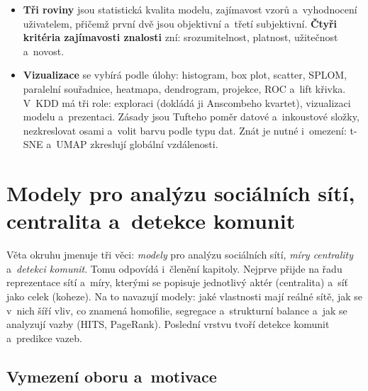 \documentclass[11pt,a4paper]{article}
\theoremstyle{definition}
\begin{document}
\begin{itemize}
      (u~stromu confidence v~listu), vzory se seřadí a~rozdělí do přihrádek a~lift křivka se
      poměřuje s~diagonálou náhodného výběru. U~zkoušky se k~tomu očekává ekonomická úvaha
      o~tom, kolik zásilek se vyplatí poslat.
\item \textbf{Tři roviny } jsou statistická kvalita modelu, zajímavost vzorů
      a~vyhodnocení uživatelem, přičemž první dvě jsou objektivní a~třetí subjektivní.
      \textbf{Čtyři kritéria zajímavosti znalosti} zní: srozumitelnost, platnost, užitečnost
      a~novost.
\item \textbf{Vizualizace} se vybírá podle úlohy: histogram, box plot, scatter, SPLOM,
      paralelní souřadnice, heatmapa, dendrogram, projekce, ROC a~lift křivka. V~KDD má
      tři role: exploraci (dokládá ji Anscombeho kvartet), vizualizaci modelu a~prezentaci.
      Zásady jsou Tufteho poměr datové a~inkoustové složky, nezkreslovat osami a~volit barvu
      podle typu dat. Znát je nutné i~omezení: t-SNE a~UMAP zkreslují globální vzdálenosti.
\end{itemize}

\newpage

\section{Modely pro analýzu sociálních sítí, centralita a~detekce komunit}
\label{sec:sna}

Věta okruhu jmenuje tři věci: \emph{modely} pro analýzu sociálních sítí, \emph{míry
centrality} a~\emph{detekci komunit}. Tomu odpovídá i~členění kapitoly. Nejprve přijde na
řadu reprezentace sítí a~míry, kterými se popisuje jednotlivý aktér (centralita) a~síť jako
celek (koheze). Na to navazují modely: jaké vlastnosti mají reálné sítě, jak se v~nich šíří
vliv, co znamená homofilie, segregace a~strukturní balance a~jak se analyzují vazby (HITS,
PageRank). Poslední vrstvu tvoří detekce komunit a~predikce vazeb.

\subsection{Vymezení oboru a~motivace}
\end{document}
